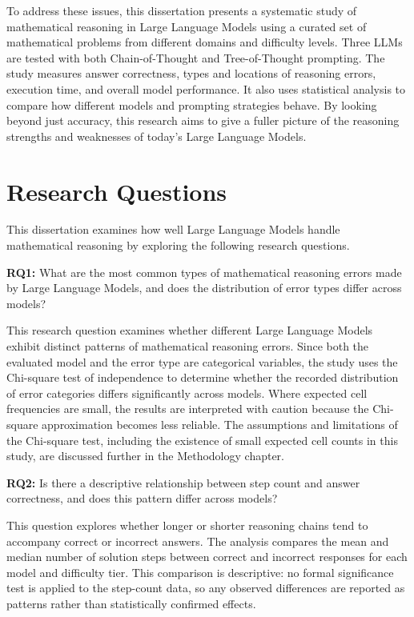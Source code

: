 To address these issues, this dissertation presents a systematic study of
mathematical reasoning in Large Language Models using a curated set of
mathematical problems from different domains and difficulty levels. Three
LLMs are tested with both Chain-of-Thought and Tree-of-Thought prompting.
The study measures answer correctness, types and locations of reasoning
errors, execution time, and overall model performance. It also uses
statistical analysis to compare how different models and prompting
strategies behave. By looking beyond just accuracy, this research aims to
give a fuller picture of the reasoning strengths and weaknesses of today's
Large Language Models.

\section{Research Questions}

This dissertation examines how well Large Language Models handle
mathematical reasoning by exploring the following research questions.

\textbf{RQ1:} What are the most common types of mathematical reasoning
errors made by Large Language Models, and does the distribution of error
types differ across models?

This research question examines whether different Large Language Models
exhibit distinct patterns of mathematical reasoning errors. Since both the
evaluated model and the error type are categorical variables, the study
uses the Chi-square test of independence to determine whether the
recorded distribution of error categories differs significantly across
models. Where expected cell frequencies are small, the results are
interpreted with caution because the Chi-square approximation becomes less
reliable. The assumptions and limitations of the Chi-square test,
including the existence of small expected cell counts in this study, are
discussed further in the Methodology chapter.

\textbf{RQ2:} Is there a descriptive relationship between step count and
answer correctness, and does this pattern differ across models?

This question explores whether longer or shorter reasoning chains tend to
accompany correct or incorrect answers. The analysis compares the mean
and median number of solution steps between correct and incorrect
responses for each model and difficulty tier. This comparison is
descriptive: no formal significance test is applied to the step-count
data, so any observed differences are reported as patterns rather than
statistically confirmed effects.

